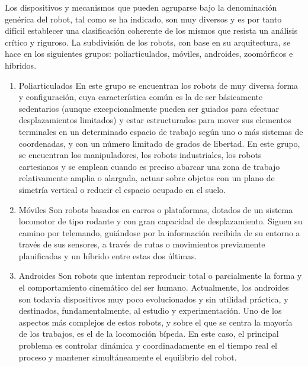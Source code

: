 Los dispositivos y mecanismos que pueden agruparse bajo la denominación genérica del robot, tal como se ha indicado, son muy diversos y es por tanto difícil establecer una clasificación coherente de los mismos que resista un análisis crítico y riguroso. La subdivisión de los robots, con base en su arquitectura, se hace en los siguientes grupos: poliarticulados, móviles, androides, zoomórficos e híbridos.

\begin{enumerate}
	\itemsep1pt \parskip1pt 
	\item Poliarticulados
	En este grupo se encuentran los robots de muy diversa forma y configuración, cuya característica común es la de ser básicamente sedentarios (aunque excepcionalmente pueden ser guiados para efectuar desplazamientos limitados) y estar estructurados para mover sus elementos terminales en un determinado espacio de trabajo según uno o más sistemas de coordenadas, y con un número limitado de grados de libertad. En este grupo, se encuentran los manipuladores, los robots industriales, los robots cartesianos y se emplean cuando es preciso abarcar una zona de trabajo relativamente amplia o alargada, actuar sobre objetos con un plano de simetría vertical o reducir el espacio ocupado en el suelo.

	\item Móviles
	Son robots basados en carros o plataformas, dotados de un sistema locomotor de tipo rodante y con gran capacidad de desplazamiento. Siguen su camino por telemando, guiándose por la información recibida de su entorno a través de sus sensores, a través de rutas o movimientos previamente planificadas y un híbrido entre estas dos últimas.

	\item Androides
	Son robots que intentan reproducir total o parcialmente la forma y el comportamiento cinemático del ser humano. Actualmente, los androides son todavía dispositivos muy poco evolucionados y sin utilidad práctica, y destinados, fundamentalmente, al estudio y experimentación. Uno de los aspectos más complejos de estos robots, y sobre el que se centra la mayoría de los trabajos, es el de la locomoción bípeda. En este caso, el principal problema es controlar dinámica y coordinadamente en el tiempo real el proceso y mantener simultáneamente el equilibrio del robot.


\end{enumerate}
